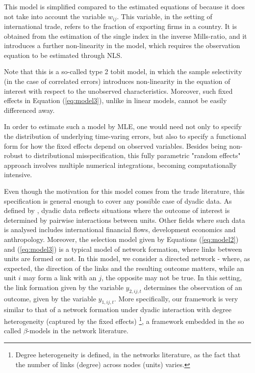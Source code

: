 This model is simplified compared to the estimated equations of \cite{helpman2008estimating} because it does not take into account the variable $w_{ij}$. This variable, in the setting of international trade, refers to the fraction of exporting firms in a country. It is obtained from the estimation of the single index in the inverse Mills-ratio, and it introduces a further non-linearity in the model, which requires the observation equation to be estimated through NLS.

Note that this is a so-called type 2 tobit model, in which the sample selectivity (in the case of correlated errors) introduces non-linearity in the equation of interest with respect to the unobserved characteristics. Moreover, such fixed effects in Equation (\ref{eq:model3}), unlike in linear models, cannot be easily differenced away. 

In order to estimate such a model by MLE, one would need not only to specify the distribution of underlying time-varing errors, but also to specify a functional form for how the fixed effects depend on observed variables. Besides being non-robust to distributional misspecification, this fully parametric "random effects" approach involves multiple numerical integrations, becoming computationally intensive.

Even though the motivation for this model comes from the trade literature, this specification is general enough to cover any possible case of dyadic data. As defined by \cite{graham2020dyadic}, dyadic data reflects situations where the outcome of interest is determined by pairwise interactions between units. Other fields where such data is analysed includes international financial flows, development economics and anthropology. Moreover, the selection model given by Equations (\ref{eq:model2}) and (\ref{eq:model3}) is a typical model of network formation, where links between units are formed or not. In this model, we consider a directed network - where, as expected, the direction of the links and the resulting outcome matters, while an unit $i$ may form a link with an $j$, the opposite may not be true. In this setting, the link formation given by the variable $y_{2,ij,t}$ determines the observation of an outcome, given by the variable $y_{1,ij,t}$.  More specifically, our framework is very similar to that of a network formation under dyadic interaction with degree heterogeneity (captured by the fixed effects) \footnote{Degree heterogeneity is defined, in the networks literature, as the fact that the number of links (degree) across nodes (units) varies.}, a framework embedded in the so called $\beta$-models in the network literature. 

